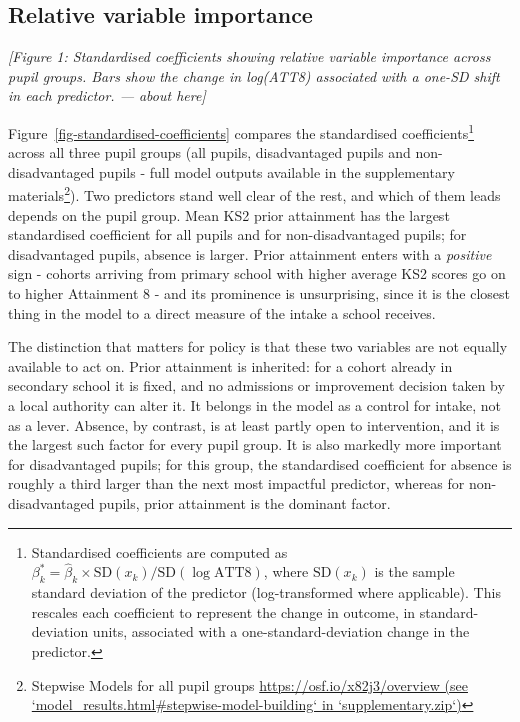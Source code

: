 \documentclass[
  12pt,
  titlepage]{article}
\begin{document}
\subsection{Relative variable
importance}\label{relative-variable-importance}

\emph{{[}Figure 1: Standardised coefficients showing relative variable
importance across pupil groups. Bars show the change in log(ATT8)
associated with a one-SD shift in each predictor. --- about here{]}}

Figure~\ref{fig-standardised-coefficients} compares the standardised
coefficients\footnote{Standardised coefficients are computed as
  \(\beta^*_k = \hat{\beta}_k \times \text{SD}(x_k) / \text{SD}(\log \text{ATT8})\),
  where \(\text{SD}(x_k)\) is the sample standard deviation of the
  predictor (log-transformed where applicable). This rescales each
  coefficient to represent the change in outcome, in standard-deviation
  units, associated with a one-standard-deviation change in the
  predictor.} across all three pupil groups (all pupils, disadvantaged
pupils and non-disadvantaged pupils - full model outputs available in
the supplementary materials\footnote{Stepwise Models for all pupil
  groups
  \href{https://osf.io/x82j3/overview}{https://osf.io/x82j3/overview
  (see `model\_results.html\#stepwise-model-building` in
  `supplementary.zip`)}}). Two predictors stand well clear of the rest,
and which of them leads depends on the pupil group. Mean KS2 prior
attainment has the largest standardised coefficient for all pupils and
for non-disadvantaged pupils; for disadvantaged pupils, absence is
larger. Prior attainment enters with a \emph{positive} sign - cohorts
arriving from primary school with higher average KS2 scores go on to
higher Attainment 8 - and its prominence is unsurprising, since it is
the closest thing in the model to a direct measure of the intake a
school receives.

The distinction that matters for policy is that these two variables are
not equally available to act on. Prior attainment is inherited: for a
cohort already in secondary school it is fixed, and no admissions or
improvement decision taken by a local authority can alter it. It belongs
in the model as a control for intake, not as a lever. Absence, by
contrast, is at least partly open to intervention, and it is the largest
such factor for every pupil group. It is also markedly more important
for disadvantaged pupils; for this group, the standardised coefficient
for absence is roughly a third larger than the next most impactful
predictor, whereas for non-disadvantaged pupils, prior attainment is the
dominant factor.
\end{document}
